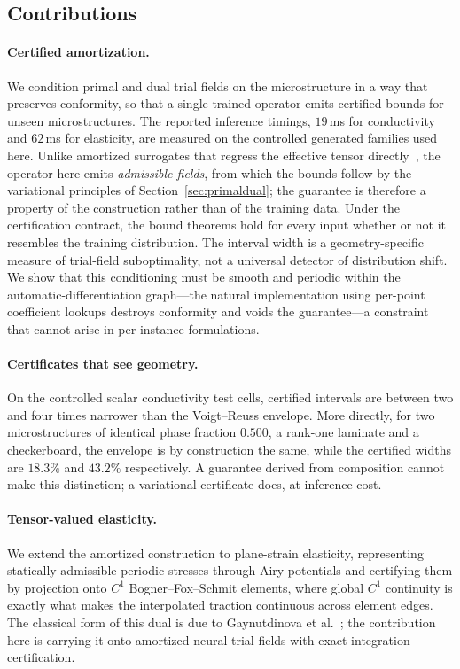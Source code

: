 \subsection{Contributions}

\paragraph{Certified amortization.} We condition primal and dual trial
fields on the microstructure in a way that preserves conformity, so that a
single trained operator emits certified bounds for unseen microstructures.
The reported inference timings, $19$\,ms for conductivity and $62$\,ms for
elasticity, are measured on the controlled generated families used here.
Unlike amortized
surrogates that regress the effective tensor
directly~\cite{Hendriks2024,Keshav2025}, the operator here emits
\emph{admissible fields}, from which the bounds follow by the variational
principles of Section~\ref{sec:primaldual}; the guarantee is therefore a
property of the construction rather than of the training data. Under the
certification contract, the bound theorems hold for every input whether or
not it resembles the training distribution. The interval width is a
geometry-specific measure of trial-field suboptimality, not a universal
detector of distribution shift. We show that this conditioning must be
smooth and periodic
within the automatic-differentiation graph---the natural implementation
using per-point coefficient lookups destroys conformity and voids the
guarantee---a constraint that cannot arise in per-instance formulations.

\paragraph{Certificates that see geometry.} On the controlled scalar
conductivity test cells, certified intervals are between two and four times
narrower than the Voigt--Reuss envelope. More directly, for two
microstructures of identical phase fraction $0.500$, a rank-one laminate and
a checkerboard, the envelope is by construction the same, while the
certified widths are $18.3\%$ and $43.2\%$ respectively. A guarantee
derived from composition cannot make this distinction; a variational
certificate does, at inference cost.

\paragraph{Tensor-valued elasticity.} We extend the amortized construction
to plane-strain elasticity, representing statically admissible periodic
stresses through Airy potentials and certifying them by projection onto
$C^1$ Bogner--Fox--Schmit elements, where global $C^1$ continuity is
exactly what makes the interpolated traction continuous across element
edges. The classical form of this dual is due to Gaynutdinova et
al.~\cite{Gaynutdinova2023}; the contribution here is carrying it onto
amortized neural trial fields with exact-integration certification.

